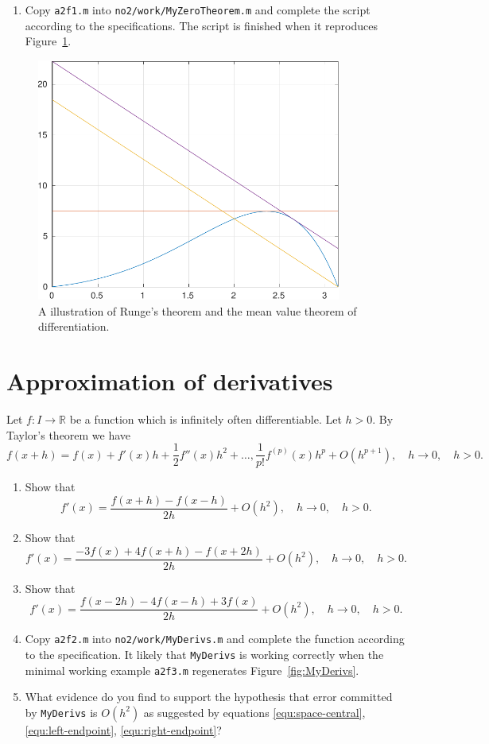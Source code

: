\documentclass[a4paper,12pt]{article}
\newcommand{\R}{\mathbb{R}}
\newcommand{\bes}{\begin{equation*}}
\newcommand{\ees}{\end{equation*}}
\newcommand{\be}{\begin{equation}}
\newcommand{\ee}{\end{equation}}
\begin{document}
  \begin{enumerate} \item
    Copy {\tt a2f1.m} into {\tt no2/work/MyZeroTheorem.m} and complete the script according to the specifications. The script is finished when it reproduces Figure~\ref{fig:MyZeroTheorems}.
  \end{enumerate}

  \begin{figure}
    \centering
    \includegraphics[width=10cm]{MyZeroTheorems.pdf} \caption[Illustration of central theorems]{A illustration of Runge's theorem and the mean value theorem of differentiation.} \label{fig:MyZeroTheorems}
    \end{figure}

  
  \section{Approximation of derivatives}

  Let $f : I \rightarrow \R$ be a function which is infinitely often differentiable. Let $h > 0$. By Taylor's theorem we have
  \bes
  f(x + h) = f(x) + f'(x) h + \frac{1}{2} f''(x) h^2 + \dotsc, \frac{1}{p!} f^{(p)}(x) h^p + O(h^{p+1}), \quad h \rightarrow 0, \quad h > 0.
  \ees
  \begin{enumerate}
  \item Show that
    \be \label{equ:space-central}
    f'(x) = \frac{f(x+h) - f(x-h)}{2h} + O(h^2), \quad h \rightarrow 0, \quad h > 0.
    \ee
  \item Show that
    \be \label{equ:left-endpoint}
    f'(x) = \frac{-3 f(x) + 4 f(x+h) - f(x+2h)}{2h} + O(h^2), \quad  h \rightarrow 0, \quad h > 0.
    \ee
  \item Show that 
    \be \label{equ:right-endpoint}
    f'(x) = \frac{f(x-2h)-4f(x-h)+3f(x)}{2h} + O(h^2), \quad  h \rightarrow 0, \quad h > 0.
    \ee
  \item Copy {\tt a2f2.m} into {\tt no2/work/MyDerivs.m} and complete the function according to the specification. It likely that {\tt MyDerivs} is working correctly when the minimal working example {\tt a2f3.m} regenerates Figure~\ref{fig:MyDerivs}.
  \item What evidence do you find to support the hypothesis that error committed by {\tt MyDerivs} is $O(h^2)$ as suggested by equations \eqref{equ:space-central}, \eqref{equ:left-endpoint}, \eqref{equ:right-endpoint}?
 \end{enumerate}
\end{document}
